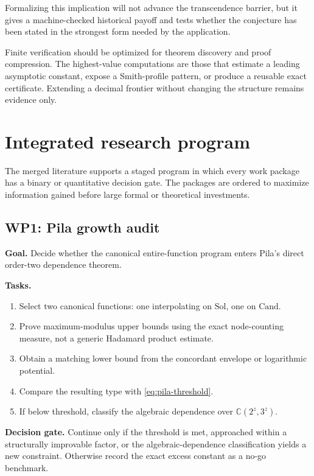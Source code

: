 \documentclass[10pt,letterpaper]{article}
\newcommand{\C}{\mathbb C}
\newcommand{\Sol}{\mathrm{Sol}}
\newcommand{\Cand}{\mathrm{Cand}}
\begin{document}
Formalizing this implication will not advance the transcendence barrier, but it gives a
machine-checked historical payoff and tests whether the conjecture has been stated in the
strongest form needed by the application.

\begin{takeawaybox}
Finite verification should be optimized for theorem discovery and proof compression.  The
highest-value computations are those that estimate a leading asymptotic constant, expose a
Smith-profile pattern, or produce a reusable exact certificate.  Extending a decimal
frontier without changing the structure remains evidence only.
\end{takeawaybox}

\section{Integrated research program}
\label{sec:program}

The merged literature supports a staged program in which every work package has a binary or
quantitative decision gate.  The packages are ordered to maximize information gained before
large formal or theoretical investments.

\subsection{WP1: Pila growth audit}

\textbf{Goal.}  Decide whether the canonical entire-function program enters Pila's direct
order-two dependence theorem.

\textbf{Tasks.}
\begin{enumerate}
\item Select two canonical functions: one interpolating on \(\Sol\), one on \(\Cand\).
\item Prove maximum-modulus upper bounds using the exact node-counting measure, not a generic
Hadamard product estimate.
\item Obtain a matching lower bound from the concordant envelope or logarithmic potential.
\item Compare the resulting type with \cref{eq:pila-threshold}.
\item If below threshold, classify the algebraic dependence over \(\C(2^z,3^z)\).
\end{enumerate}

\textbf{Decision gate.}  Continue only if the threshold is met, approached within a
structurally improvable factor, or the algebraic-dependence classification yields a new
constraint.  Otherwise record the exact excess constant as a no-go benchmark.
\end{document}
